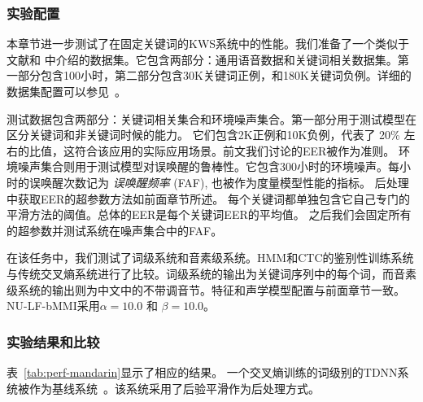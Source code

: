 \subsubsection{实验配置}
\label{Sec:exp-wakeup-word-rec-setup}
本章节进一步测试了在固定关键词的KWS系统中的性能。我们准备了一个类似于文献\cite{chen2014small}和  \cite{cas-icassp17}中介绍的数据集。它包含两部分：通用语音数据和关键词相关数据集。第一部分包含100小时，第二部分包含30K关键词正例，和180K关键词负例。详细的数据集配置可以参见~\cite{chen2018kws}。

测试数据包含两部分：关键词相关集合和环境噪声集合。第一部分用于测试模型在区分关键词和非关键词时候的能力\cite{chen2014small}。 它们包含2K正例和10K负例，代表了 20\% 左右的比值，这符合该应用的实际应用场景。前文我们讨论的EER被作为准则。
环境噪声集合则用于测试模型对误唤醒的鲁棒性\cite{cas-icassp17}。它包含300小时的环境噪声。每小时的误唤醒次数记为 {\em{误唤醒频率}} (FAF), 也被作为度量模型性能的指标。
后处理中获取EER的超参数方法如前面章节所述。
每个关键词都单独包含它自己专门的平滑方法的阈值。总体的EER是每个关键词EER的平均值。
之后我们会固定所有的超参数并测试系统在噪声集合中的FAF。

在该任务中，我们测试了词级系统和音素级系统。HMM和CTC的鉴别性训练系统与传统交叉熵系统进行了比较。词级系统的输出为关键词序列中的每个词，而音素级系统的输出则为中文中的不带调音节。特征和声学模型配置与前面章节一致。
NU-LF-bMMI采用$\alpha=10.0$ 和 $\beta=10.0$。

\subsubsection{实验结果和比较}
\label{Sec:exp-wakeup-word-rec-result}

表~\ref{tab:perf-mandarin}显示了相应的结果。
一个交叉熵训练的词级别的TDNN系统被作为基线系统~\cite{chen2014small}。该系统采用了后验平滑作为后处理方式。


